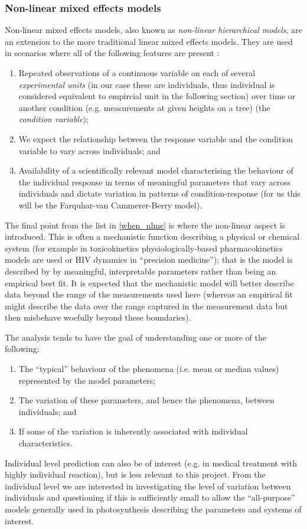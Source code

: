 \documentclass[11pt]{article} %
\begin{document}
\subsubsection{Non-linear mixed effects models}
Non-linear mixed effects models, also known as \emph{non-linear hierarchical models}, are an extension to the more traditional linear mixed effects models. They are used in scenarios where all of the following features are present \cite{DavidianNonlinearmodelsrepeated2003a}:
\begin{enumerate}  \label{when_nlme}
 \item Repeated observations of a continuous variable on each of several \emph{experimental units} (in our case these are individuals, thus individual is considered equivalent to empircial unit in the following section) over time or another condition (e.g. measurements at given heights on a tree) (the \emph{condition variable});
 \item We expect the relationship between the response variable and the condition variable to vary across individuals; and
 \item Availability of a scientifically relevant model characterising the behaviour of the individual response in terms of meaningful parameters that vary across individuals and dictate variation in patterns of condition-response (for us this will be the Farquhar-van Cammerer-Berry model).
\end{enumerate}
The final point from the list in \ref{when_nlme} is where the non-linear aspect is introduced. This is often a mechanistic function describing a physical or chemical system (for example in toxicokinetics physiologically-based pharmacokinetics models are used or HIV dynamics in ``precision medicine''); that is the model is described by by meaningful, interpretable parameters rather than being an empirical best fit. It is expected that the mechanistic model will better describe data beyond the range of the measurements used here (whereas an empirical fit might describe the data over the range captured in the measurement data but then misbehave woefully beyond these boundaries).

The analysis tends to have the goal of understanding one or more of the following:
\begin{enumerate}
 \item The ``typical'' behaviour of the phenomena (i.e. mean or median values) represented by the model parameters;
 \item The variation of these parameters, and hence the phenomena, between individuals; and
 \item If some of the variation is inherently associated with individual characteristics.
\end{enumerate}
Individual level prediction can also be of interest (e.g. in medical treatment with highly individual reaction), but is less relevant to this project. From the individual level we are interested in investigating the level of variation between individuals and questioning if this is sufficiently small to allow the ``all-purpose'' models generally used in photosynthesis describing the parameters and systems of interest.
\end{document}
